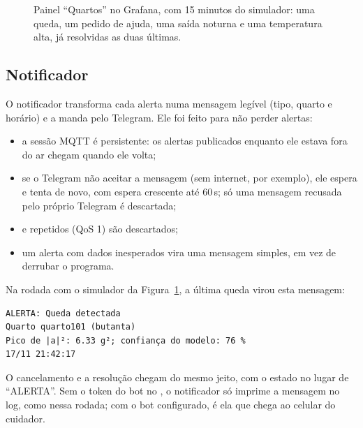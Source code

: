 \begin{figure}[H]
\centering
{}
\caption{Painel ``Quartos'' no Grafana, com 15 minutos do simulador: uma queda, um pedido de
ajuda, uma saída noturna e uma temperatura alta, já resolvidas as duas últimas.}
\label{fig:grafana}
\end{figure}

\subsection{Notificador}

O notificador transforma cada alerta numa mensagem legível (tipo, quarto e horário) e a manda
pelo Telegram. Ele foi feito para não perder alertas:
\begin{itemize}
  \item a sessão MQTT é persistente: os alertas publicados enquanto ele estava fora do ar
        chegam quando ele volta;
  \item se o Telegram não aceitar a mensagem (sem internet, por exemplo), ele espera e tenta de
        novo, com espera crescente até 60\,s; só uma mensagem recusada pelo próprio Telegram
        é descartada;
  \item {} e  repetidos (QoS 1) são descartados;
  \item um alerta com dados inesperados vira uma mensagem simples, em vez de derrubar o
        programa.
\end{itemize}

Na rodada com o simulador da Figura~\ref{fig:grafana}, a última queda virou esta mensagem:
\begin{lstlisting}
ALERTA: Queda detectada
Quarto quarto101 (butanta)
Pico de |a|²: 6.33 g²; confiança do modelo: 76 %
17/11 21:42:17
\end{lstlisting}
O cancelamento e a resolução chegam do mesmo jeito, com o estado no lugar de ``ALERTA''. Sem o
token do bot no , o notificador só imprime a mensagem no log, como nessa rodada; com o
bot configurado, é ela que chega ao celular do cuidador.


